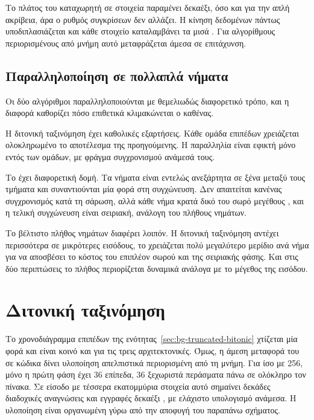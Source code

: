 Το πλάτος του καταχωρητή σε στοιχεία παραμένει δεκαέξι, όσο και για την απλή
ακρίβεια, άρα ο ρυθμός συγκρίσεων δεν αλλάζει. Η κίνηση δεδομένων πάντως
υποδιπλασιάζεται και κάθε στοιχείο καταλαμβάνει τα μισά . Για
αλγορίθμους περιορισμένους από μνήμη αυτό μεταφράζεται άμεσα σε επιτάχυνση.

\subsection{Παραλληλοποίηση σε πολλαπλά νήματα}
\label{sec:cpu-threads}

Οι δύο αλγόριθμοι παραλληλοποιούνται με θεμελιωδώς διαφορετικό τρόπο, και η
διαφορά καθορίζει πόσο επιθετικά κλιμακώνεται ο καθένας.

Η διτονική ταξινόμηση έχει καθολικές εξαρτήσεις. Κάθε ομάδα επιπέδων χρειάζεται
ολοκληρωμένο το αποτέλεσμα της προηγούμενης. Η παραλληλία είναι εφικτή μόνο
εντός των ομάδων, με φράγμα συγχρονισμού ανάμεσά τους.

Το  έχει διαφορετική δομή. Τα νήματα είναι εντελώς ανεξάρτητα σε
ξένα μεταξύ τους τμήματα και συναντιούνται μία φορά στη συγχώνευση. Δεν
απαιτείται κανένας συγχρονισμός κατά τη σάρωση, αλλά κάθε νήμα κρατά δικό του
σωρό μεγέθους , και η τελική συγχώνευση είναι σειριακή, ανάλογη του
πλήθους νημάτων.

Το βέλτιστο πλήθος νημάτων διαφέρει λοιπόν. Η διτονική ταξινόμηση αντέχει
περισσότερα σε μικρότερες εισόδους, το  χρειάζεται πολύ
μεγαλύτερο μερίδιο ανά νήμα για να αποσβέσει το κόστος του επιπλέον σωρού και
της σειριακής φάσης. Και στις δύο περιπτώσεις το πλήθος περιορίζεται δυναμικά
ανάλογα με το μέγεθος της εισόδου.

\section{Διτονική ταξινόμηση}
\label{sec:cpu-bitonic}

Το χρονοδιάγραμμα επιπέδων της ενότητας~\ref{sec:bg-truncated-bitonic} χτίζεται
μία φορά και είναι κοινό και για τις τρεις αρχιτεκτονικές. Όμως, η άμεση
μεταφορά του σε κώδικα δίνει υλοποίηση απελπιστικά περιορισμένη από τη μνήμη.
Για  ίσο με 256, μόνο η πρώτη φάση έχει 36 επίπεδα, 36 ξεχωριστά
περάσματα πάνω σε ολόκληρο τον πίνακα. Σε είσοδο με τέσσερα εκατομμύρια
στοιχεία αυτό σημαίνει δεκάδες διαδοχικές αναγνώσεις και εγγραφές δεκαέξι
, με ελάχιστο υπολογισμό ανάμεσα. Η υλοποίηση είναι οργανωμένη γύρω από
την αποφυγή του παραπάνω σχήματος.

